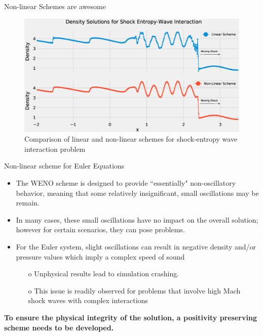 \documentclass[9pt]{beamer}
\begin{document}
\begin{frame}{Non-linear Schemes are awesome}
  \begin{figure}[H]
    \centering
    \includegraphics[scale=0.25]{DensitySolutions.eps}\caption{Comparison of linear and non-linear schemes for shock-entropy wave interaction problem}
      \label{fig:ShockEntropy}
    \end{figure}
\end{frame}

\begin{frame}{Non-linear scheme for Euler Equations}
  \begin{itemize}
    \item The WENO scheme is designed to provide ``essentially" non-oscillatory behavior, meaning that some relatively insignificant, small oscillations may be remain.
    \item In many cases, these small oscillations have no impact on the overall solution; however for certain scenarios, they can pose problems.
    \item For the Euler system, slight oscillations can result in negative density and/or pressure values which imply a complex speed of sound
    \begin{itemize}
      \item[o] Unphysical results lead to simulation crashing.
      \item[o] This issue is readily observed for problems that involve high Mach shock waves with complex interactions
    \end{itemize}  
  \end{itemize}
  \textbf{To ensure the physical integrity of the solution, a positivity preserving scheme needs to be developed.}
\end{frame}
\end{document}
